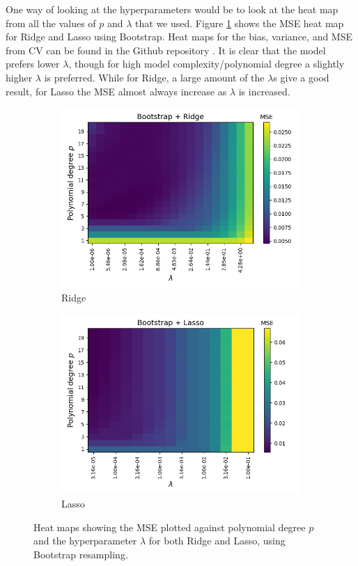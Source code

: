 \documentclass[a4paper]{article}
\begin{document}
One way of looking at the hyperparameters would be to look at the heat map from all the values of $p$ and $\lambda$ that we used. Figure \ref{fig:franke_heatmap} shows the MSE heat map for Ridge and Lasso using Bootstrap. Heat maps for the bias, variance, and MSE from CV can be found in the Github repository \cite{Github1}. It is clear that the model prefers lower $\lambda$, though for high model complexity/polynomial degree a slightly higher $\lambda$ is preferred. While for Ridge, a large amount of the $\lambda$s give a good result, for Lasso the MSE almost always increase as $\lambda$ is increased. 
\begin{figure}[H]
  \centering
  \begin{subfigure}{0.49\textwidth}
    \includegraphics[scale=0.45]{../figures/task_d/heatmap_bs_error_N529_pmax20_nlamb20_noise0.05_seed4155_Ridge_boot_Nbs264.png}
    \caption{Ridge}
  \end{subfigure}
  \begin{subfigure}{0.49\textwidth}
    \includegraphics[scale=0.45]{../figures/task_e/heatmap_bs_error_N529_pmax20_nlamb15_noise0.05_seed4155_Lasso_boot_Nbs264.png}
    \caption{Lasso}
  \end{subfigure}
  \caption{Heat maps showing the MSE plotted against polynomial degree $p$ and the hyperparameter $\lambda$ for both Ridge and Lasso, using Bootstrap resampling.}
  \label{fig:franke_heatmap}
\end{figure}
\end{document}
